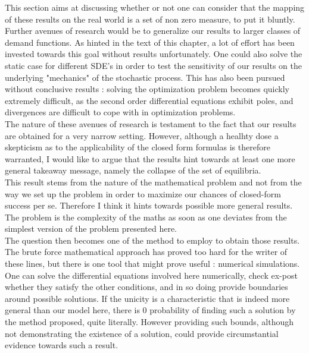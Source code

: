 This section aims at discussing whether or not one can consider that the mapping of these results on the real world is a set of non zero measure, to put it bluntly.\\

Further avenues of research would be to generalize our results to larger classes of demand functions. As hinted in the text of this chapter, a lot of effort has been invested towards this goal without results unfortunately. One could also solve the static case for different SDE's in order to test the sensitivity of our results on the underlying "mechanics" of the stochastic process. This has also been pursued without conclusive results : solving the optimization problem becomes quickly extremely difficult, as the second order differential equations exhibit poles, and divergences are difficult to cope with in optimization problems. \\

The nature of these avenues of research is testament to the fact that our results are obtained for a very narrow setting. However, although a healhty dose a skepticism as to the applicability of the closed form formulas is therefore warranted, I would like to argue that the results hint towards at least one more general takeaway message, namely the collapse of the set of equilibria.\\

This result stems from the nature of the mathematical problem and not from the way we set up the problem in order to maximize our chances of closed-form success per se. Therefore I think it hints towards possible more general results. The problem is the complexity of the maths as soon as one deviates from the simplest version of the problem presented here. \\

The question then becomes one of the method to employ to obtain those results. The brute force mathematical approach has proved too hard for the writer of these lines, but there is one tool that might prove useful : numerical simulations. One can solve the differential equations involved here numerically, check ex-post whether they satisfy the other conditions, and in so doing provide boundaries around possible solutions. If the unicity is a characteristic that is indeed more general than our model here, there is 0 probability of finding such a solution by the method proposed, quite literally. However providing such bounds, although not demonstrating the existence of a solution, could provide circumstantial evidence towards such a result.\\

